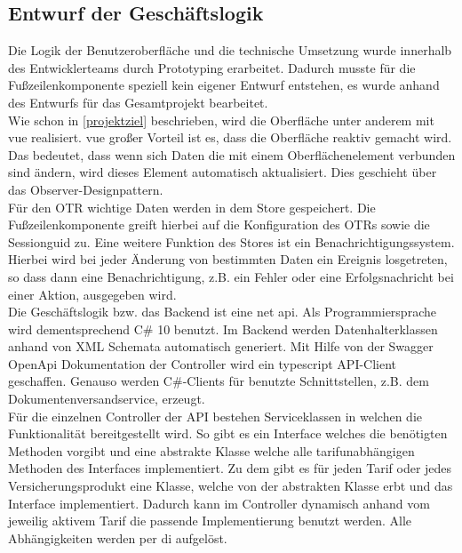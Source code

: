 \subsection{Entwurf der Geschäftslogik}
\label{geschaeftslogik}
Die Logik der Benutzeroberfläche und die technische Umsetzung wurde innerhalb des Entwicklerteams durch Prototyping erarbeitet.
Dadurch musste für die Fußzeilenkomponente speziell kein eigener Entwurf entstehen, es wurde anhand des Entwurfs für das Gesamtprojekt bearbeitet.\\
Wie schon in \ref{projektziel}  beschrieben, wird die Oberfläche unter anderem mit \gls{vue} realisiert. \gls{vue} großer Vorteil ist es, dass die Oberfläche reaktiv gemacht wird. Das bedeutet, dass wenn sich Daten die mit einem Oberflächenelement verbunden sind ändern, wird dieses Element automatisch aktualisiert. Dies geschieht über das Observer-Designpattern.\\
Für den \ac{OTR} wichtige Daten werden in dem Store gespeichert. Die Fußzeilenkomponente greift hierbei auf die Konfiguration des \ac{OTR}s sowie die Sessionguid zu.
Eine weitere Funktion des Stores ist ein Benachrichtigungssystem. Hierbei wird bei jeder Änderung von bestimmten Daten ein Ereignis losgetreten, so dass dann eine Benachrichtigung, z.B. ein Fehler oder eine Erfolgsnachricht bei einer Aktion, ausgegeben wird.\\

Die Geschäftslogik bzw. das Backend ist eine \gls{net} \gls{api}. Als Programmiersprache wird dementsprechend C\# 10 benutzt.
Im Backend werden Datenhalterklassen anhand von XML Schemata automatisch generiert. Mit Hilfe von der Swagger OpenApi Dokumentation der Controller wird ein \gls{typescript} API-Client geschaffen. Genauso werden C\#-Clients für benutzte Schnittstellen, z.B. dem Dokumentenversandservice, erzeugt.\\
Für die einzelnen Controller der API bestehen Serviceklassen in welchen die Funktionalität bereitgestellt wird. So gibt es ein Interface welches die benötigten Methoden vorgibt und eine abstrakte Klasse welche alle tarifunabhängigen Methoden des Interfaces implementiert. Zu dem gibt es für jeden Tarif oder jedes Versicherungsprodukt eine Klasse, welche von der abstrakten Klasse erbt und das Interface implementiert. Dadurch kann im Controller dynamisch anhand vom jeweilig aktivem Tarif die passende Implementierung benutzt werden. %
Alle Abhängigkeiten werden per \gls{di} aufgelöst.
